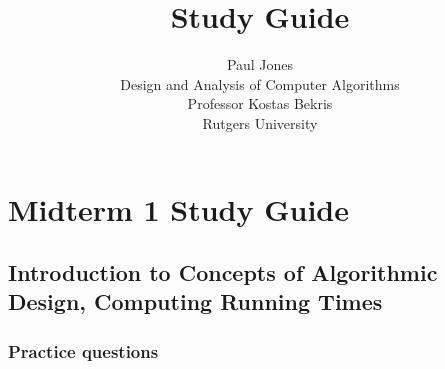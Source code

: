 \documentclass[a4paper,11pt]{article}
\title{Study Guide}
\author{Paul Jones \\ {\small  Design and Analysis of Computer Algorithms} \\ {\small Professor Kostas Bekris} \\ {\small Rutgers University}}
\begin{document}
\doublespacing

\maketitle


\singlespacing


{
\clearpage
\hypersetup{linkcolor=black}
\setcounter{tocdepth}{3}
\tableofcontents
\clearpage
}



\section{Midterm 1 Study Guide}\label{midterm-1-study-guide}

\subsection{Introduction to Concepts of Algorithmic Design, Computing
Running
Times}\label{introduction-to-concepts-of-algorithmic-design-computing-running-times}

\subsubsection{Practice questions}\label{practice-questions}
\end{document}
